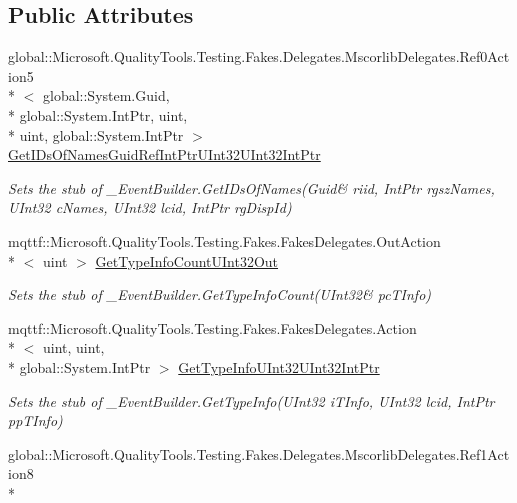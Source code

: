 \subsection*{Public Attributes}
\begin{DoxyCompactItemize}
\item 
global\-::\-Microsoft.\-Quality\-Tools.\-Testing.\-Fakes.\-Delegates.\-Mscorlib\-Delegates.\-Ref0\-Action5\\*
$<$ global\-::\-System.\-Guid, \\*
global\-::\-System.\-Int\-Ptr, uint, \\*
uint, global\-::\-System.\-Int\-Ptr $>$ \hyperlink{class_system_1_1_runtime_1_1_interop_services_1_1_fakes_1_1_stub___event_builder_ae899931f8a271dd590dda58bdb6e2a8c}{Get\-I\-Ds\-Of\-Names\-Guid\-Ref\-Int\-Ptr\-U\-Int32\-U\-Int32\-Int\-Ptr}
\begin{DoxyCompactList}\small\item\em Sets the stub of \-\_\-\-Event\-Builder.\-Get\-I\-Ds\-Of\-Names(Guid\& riid, Int\-Ptr rgsz\-Names, U\-Int32 c\-Names, U\-Int32 lcid, Int\-Ptr rg\-Disp\-Id)\end{DoxyCompactList}\item 
mqttf\-::\-Microsoft.\-Quality\-Tools.\-Testing.\-Fakes.\-Fakes\-Delegates.\-Out\-Action\\*
$<$ uint $>$ \hyperlink{class_system_1_1_runtime_1_1_interop_services_1_1_fakes_1_1_stub___event_builder_aec069a940210b3d28897d9b059eb3469}{Get\-Type\-Info\-Count\-U\-Int32\-Out}
\begin{DoxyCompactList}\small\item\em Sets the stub of \-\_\-\-Event\-Builder.\-Get\-Type\-Info\-Count(U\-Int32\& pc\-T\-Info)\end{DoxyCompactList}\item 
mqttf\-::\-Microsoft.\-Quality\-Tools.\-Testing.\-Fakes.\-Fakes\-Delegates.\-Action\\*
$<$ uint, uint, \\*
global\-::\-System.\-Int\-Ptr $>$ \hyperlink{class_system_1_1_runtime_1_1_interop_services_1_1_fakes_1_1_stub___event_builder_a3cb76c61ee9ce8678c9d10cd2f3d119e}{Get\-Type\-Info\-U\-Int32\-U\-Int32\-Int\-Ptr}
\begin{DoxyCompactList}\small\item\em Sets the stub of \-\_\-\-Event\-Builder.\-Get\-Type\-Info(\-U\-Int32 i\-T\-Info, U\-Int32 lcid, Int\-Ptr pp\-T\-Info)\end{DoxyCompactList}\item 
global\-::\-Microsoft.\-Quality\-Tools.\-Testing.\-Fakes.\-Delegates.\-Mscorlib\-Delegates.\-Ref1\-Action8\\*

\end{DoxyCompactItemize}
